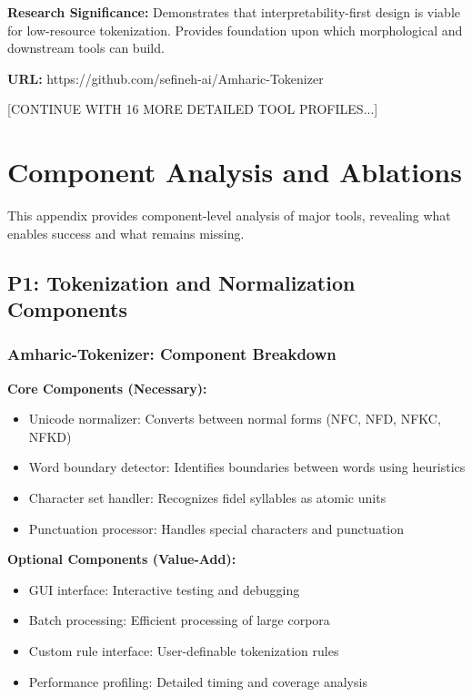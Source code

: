 \documentclass[12pt,a4paper]{article}
\theoremstyle{plain}
\theoremstyle{definition}
\begin{document}
\textbf{Research Significance:} Demonstrates that interpretability-first design is viable for low-resource tokenization. Provides foundation upon which morphological and downstream tools can build.

\textbf{URL:} https://github.com/sefineh-ai/Amharic-Tokenizer

[CONTINUE WITH 16 MORE DETAILED TOOL PROFILES...]



\section{Component Analysis and Ablations}
\label{app:ablations}

This appendix provides component-level analysis of major tools, revealing what enables success and what remains missing.

\subsection{P1: Tokenization and Normalization Components}

\subsubsection{Amharic-Tokenizer: Component Breakdown}

\textbf{Core Components (Necessary):}
\begin{itemize}
\item Unicode normalizer: Converts between normal forms (NFC, NFD, NFKC, NFKD)
\item Word boundary detector: Identifies boundaries between words using heuristics
\item Character set handler: Recognizes fidel syllables as atomic units
\item Punctuation processor: Handles special characters and punctuation
\end{itemize}

\textbf{Optional Components (Value-Add):}
\begin{itemize}
\item GUI interface: Interactive testing and debugging
\item Batch processing: Efficient processing of large corpora
\item Custom rule interface: User-definable tokenization rules
\item Performance profiling: Detailed timing and coverage analysis
\end{itemize}
\end{document}
